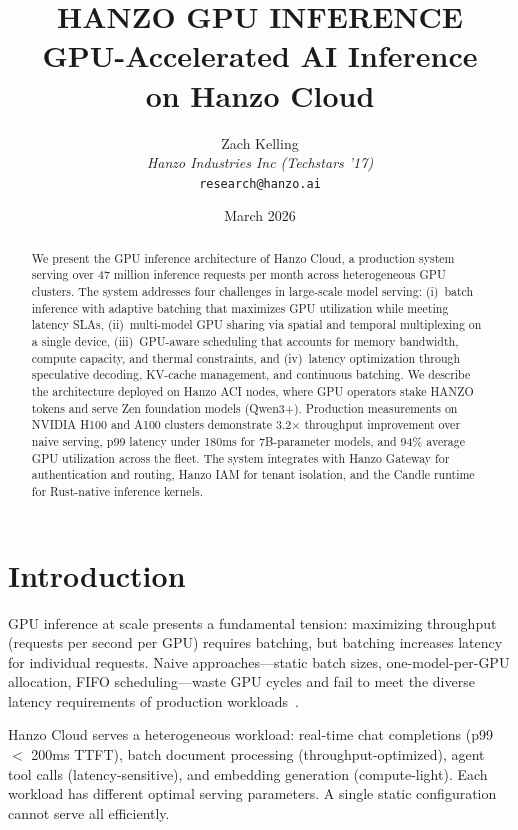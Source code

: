 \documentclass[11pt]{article}
\title{HANZO GPU INFERENCE\\[0.3em]
{\large GPU-Accelerated AI Inference\\on Hanzo Cloud}}
\author{
    Zach Kelling \\
    \textit{Hanzo Industries Inc (Techstars '17)} \\
    \texttt{research@hanzo.ai}
}
\date{March 2026}
\begin{document}
\hanzocoverpage

\begin{abstract}
We present the GPU inference architecture of Hanzo Cloud, a production system
serving over 47 million inference requests per month across heterogeneous GPU
clusters. The system addresses four challenges in large-scale model serving:
(i)~batch inference with adaptive batching that maximizes GPU utilization while
meeting latency SLAs, (ii)~multi-model GPU sharing via spatial and temporal
multiplexing on a single device, (iii)~GPU-aware scheduling that accounts for
memory bandwidth, compute capacity, and thermal constraints, and (iv)~latency
optimization through speculative decoding, KV-cache management, and continuous
batching. We describe the architecture deployed on Hanzo ACI nodes, where GPU
operators stake HANZO tokens and serve Zen foundation models (Qwen3+). Production
measurements on NVIDIA H100 and A100 clusters demonstrate 3.2$\times$ throughput
improvement over naive serving, p99 latency under 180ms for 7B-parameter models,
and 94\% average GPU utilization across the fleet. The system integrates with
Hanzo Gateway for authentication and routing, Hanzo IAM for tenant isolation,
and the Candle runtime for Rust-native inference kernels.
\end{abstract}

\section{Introduction}
\label{sec:intro}

GPU inference at scale presents a fundamental tension: maximizing throughput
(requests per second per GPU) requires batching, but batching increases latency
for individual requests. Naive approaches---static batch sizes, one-model-per-GPU
allocation, FIFO scheduling---waste GPU cycles and fail to meet the diverse
latency requirements of production workloads~\cite{orca2022,vllm2023}.

Hanzo Cloud serves a heterogeneous workload: real-time chat completions (p99
$<$ 200ms TTFT), batch document processing (throughput-optimized), agent tool
calls (latency-sensitive), and embedding generation (compute-light). Each
workload has different optimal serving parameters. A single static configuration
cannot serve all efficiently.
\end{document}
